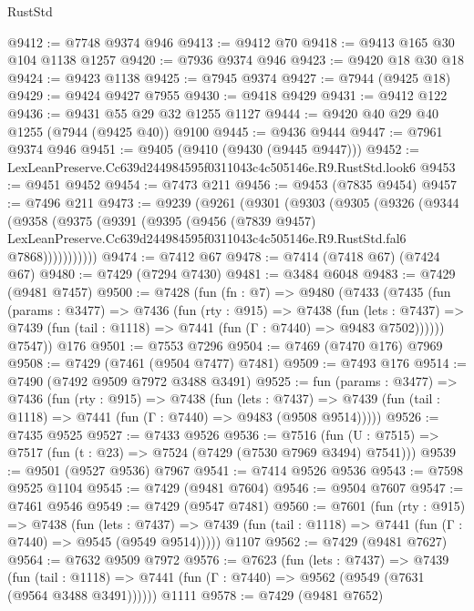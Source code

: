 \begin{lexlean}{RustStd}
\begin{coremodule}
@9412 := @7748 @9374 @946
@9413 := @9412 @70
@9418 := @9413 @165 @30 @104 @1138 @1257
@9420 := @7936 @9374 @946
@9423 := @9420 @18 @30 @18
@9424 := @9423 @1138
@9425 := @7945 @9374
@9427 := @7944 (@9425 @18)
@9429 := @9424 @9427 @7955
@9430 := @9418 @9429
@9431 := @9412 @122
@9436 := @9431 @55 @29 @32 @1255 @1127
@9444 := @9420 @40 @29 @40 @1255 (@7944 (@9425 @40)) @9100
@9445 := @9436 @9444
@9447 := @7961 @9374 @946
@9451 := @9405 (@9410 (@9430 (@9445 @9447)))
@9452 := LexLeanPreserve.Cc639d244984595f0311043c4c505146e.R9.RustStd.look6
@9453 := @9451 @9452
@9454 := @7473 @211
@9456 := @9453 (@7835 @9454)
@9457 := @7496 @211
@9473 := @9239
    (@9261
      (@9301
        (@9303
          (@9305
            (@9326
              (@9344
                (@9358
                  (@9375
                    (@9391
                      (@9395
                        (@9456
                          (@7839 @9457)
                          LexLeanPreserve.Cc639d244984595f0311043c4c505146e.R9.RustStd.fal6
                          @7868)))))))))))
@9474 := @7412 @67
@9478 := @7414 (@7418 @67) (@7424 @67)
@9480 := @7429 (@7294 @7430)
@9481 := @3484 @6048
@9483 := @7429 (@9481 @7457)
@9500 := @7428
    (fun (fn : @7) =>
    @9480
      (@7433
        (@7435
          (fun (params : @3477) =>
          @7436
            (fun (rty : @915) =>
            @7438
              (fun (lets : @7437) =>
              @7439 (fun (tail : @1118) => @7441 (fun (Γ : @7440) => @9483 @7502))))))
        @7547))
    @176
@9501 := @7553 @7296
@9504 := @7469 (@7470 @176) @7969
@9508 := @7429 (@7461 (@9504 @7477) @7481)
@9509 := @7493 @176
@9514 := @7490 (@7492 @9509 @7972 @3488 @3491)
@9525 := fun (params : @3477) =>
  @7436
    (fun (rty : @915) =>
    @7438
      (fun (lets : @7437) =>
      @7439 (fun (tail : @1118) => @7441 (fun (Γ : @7440) => @9483 (@9508 @9514)))))
@9526 := @7435 @9525
@9527 := @7433 @9526
@9536 := @7516 (fun (U : @7515) => @7517 (fun (t : @23) => @7524 (@7429 (@7530 @7969 @3494) @7541)))
@9539 := @9501 (@9527 @9536) @7967
@9541 := @7414 @9526 @9536
@9543 := @7598 @9525 @1104
@9545 := @7429 (@9481 @7604)
@9546 := @9504 @7607
@9547 := @7461 @9546
@9549 := @7429 (@9547 @7481)
@9560 := @7601
    (fun (rty : @915) =>
    @7438
      (fun (lets : @7437) =>
      @7439 (fun (tail : @1118) => @7441 (fun (Γ : @7440) => @9545 (@9549 @9514)))))
    @1107
@9562 := @7429 (@9481 @7627)
@9564 := @7632 @9509 @7972
@9576 := @7623
    (fun (lets : @7437) =>
    @7439
      (fun (tail : @1118) => @7441 (fun (Γ : @7440) => @9562 (@9549 (@7631 (@9564 @3488 @3491))))))
    @1111
@9578 := @7429 (@9481 @7652)

\end{coremodule}
\end{lexlean}
